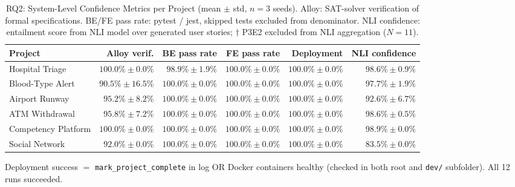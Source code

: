 \begin{table}[t]
\centering
\caption{RQ2: System-Level Confidence Metrics per Project (mean $\pm$ std, $n=3$ seeds). Alloy: SAT-solver verification of formal specifications. BE/FE pass rate: pytest / jest, skipped tests excluded from denominator. NLI confidence: entailment score from NLI model over generated user stories; $\dagger$ P3E2 excluded from NLI aggregation ($N=11$).}
\label{tab:rq2_quality}
\renewcommand{\arraystretch}{1.15}
\begin{tabular}{@{}lrrrrr@{}}
\toprule
\textbf{Project} & \textbf{Alloy verif.} & \textbf{BE pass rate} & \textbf{FE pass rate} & \textbf{Deployment} & \textbf{NLI confidence} \\
\midrule
\rowcolor[HTML]{E8F4FF} Hospital Triage & $100.0\% \pm 0.0\%$ & $98.9\% \pm 1.9\%$ & $100.0\% \pm 0.0\%$ & $100.0\% \pm 0.0\%$ & $98.6\% \pm 0.9\%$ \\
\rowcolor[HTML]{E8F5E8} Blood-Type Alert & $90.5\% \pm 16.5\%$ & $100.0\% \pm 0.0\%$ & $100.0\% \pm 0.0\%$ & $100.0\% \pm 0.0\%$ & $97.7\% \pm 1.9\%$ \\
\rowcolor[HTML]{FEF7E0} Airport Runway & $95.2\% \pm 8.2\%$ & $100.0\% \pm 0.0\%$ & $100.0\% \pm 0.0\%$ & $100.0\% \pm 0.0\%$ & $92.6\% \pm 6.7\%$ \\
\rowcolor[HTML]{F8EAF2} ATM Withdrawal & $95.8\% \pm 7.2\%$ & $100.0\% \pm 0.0\%$ & $100.0\% \pm 0.0\%$ & $100.0\% \pm 0.0\%$ & $98.6\% \pm 0.5\%$ \\
\rowcolor[HTML]{EAF0FF} Competency Platform & $100.0\% \pm 0.0\%$ & $100.0\% \pm 0.0\%$ & $100.0\% \pm 0.0\%$ & $100.0\% \pm 0.0\%$ & $98.9\% \pm 0.0\%$ \\
\rowcolor[HTML]{FFF5E0} Social Network & $92.0\% \pm 0.0\%$ & $100.0\% \pm 0.0\%$ & $100.0\% \pm 0.0\%$ & $100.0\% \pm 0.0\%$ & $83.5\% \pm 0.0\%$ \\
\bottomrule
\end{tabular}
\footnotesize Deployment success $=$ \texttt{mark\_project\_complete} in log OR Docker containers healthy (checked in both root and \texttt{dev/} subfolder). All 12 runs succeeded.
\end{table}
